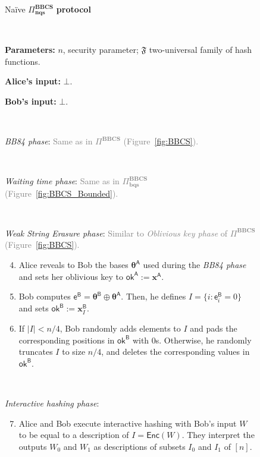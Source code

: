 \begin{figure}[h!]
\centering
\begin{tcolorbox}
                        
    \centerline{Na\"ive $\Pi^{\textbf{BBCS}}_{\textbf{nqs}}$ \textbf{protocol}}
            
    \
    
    \textbf{Parameters:} $n$, security parameter; $\mathfrak{F}$ two-universal family of hash functions.
    
    \textbf{Alice's input:} $\bot$.  
    
    \textbf{Bob's input:} $\bot$. 
    
    \
    
    \textit{BB84 phase}: \textcolor{gray}{Same as in $\Pi^{\textbf{BBCS}}$ (Figure~\ref{fig:BBCS}).}
    
    
    \
    
    \textit{Waiting time phase}: \textcolor{gray}{Same as in $\Pi^{\textbf{BBCS}}_{\textbf{bqs}}$ (Figure~\ref{fig:BBCS_Bounded}).}
    
    \
    
    \textit{Weak String Erasure phase}: \textcolor{gray}{Similar to \textit{Oblivious key phase} of $\Pi^{\textbf{BBCS}}$ (Figure~\ref{fig:BBCS}).}
    \begin{enumerate}
        \setcounter{enumi}{3}
        \item Alice reveals to Bob the bases $\bm{\theta}^{\mathsf{A}}$ used during the \textit{BB84 phase} and sets her oblivious key to $\mathsf{ok}^{\mathsf{A}}:=\bm{x}^{\mathsf{A}}$.
        
        \item Bob computes $\mathsf{e}^\mathsf{B} = \bm{\theta}^{\mathsf{B}} \oplus \bm{\theta}^{\mathsf{A}}$. Then, he defines $I = \{ i : \mathsf{e}^{\mathsf{B}}_i = 0 \}$ and sets $\mathsf{ok}^{\mathsf{B}}:=\bm{x}^{\mathsf{B}}_{I}$.
        
        \item If $|I| < n/4$, Bob randomly adds elements to $I$ and pads the corresponding positions in $\mathsf{ok}^{\mathsf{B}}$ with $0$s. Otherwise, he randomly truncates $I$ to size $n/4$, and deletes the corresponding values in $\mathsf{ok}^{\mathsf{B}}$.
    \end{enumerate}
     
    \ 
     
    \textit{Interactive hashing phase}: 
    \begin{enumerate}
        \setcounter{enumi}{6}
        \item Alice and Bob execute interactive hashing with Bob’s input $W$ to be equal to a description of $I = \mathsf{Enc}(W)$. They interpret the outputs $W_0$ and $W_1$ as descriptions of subsets $I_0$ and $I_1$ of $[n]$.
    \end{enumerate}
    

\end{tcolorbox}
\end{figure}
